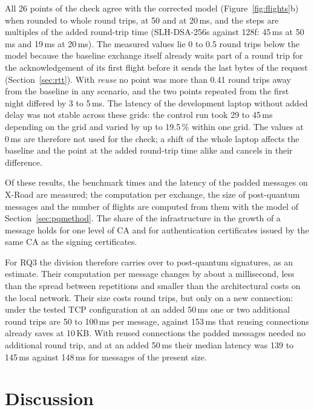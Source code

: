 \documentclass[conference,a4paper]{IEEEtran}
\newcommand{\newtext}[1]{{\color{blue}#1}}
\begin{document}
{\newtext{All} \newtext{26} \newtext{points} \newtext{of the check} \newtext{agree with the corrected model} \newtext{(Figure~\ref{fig:flights}\newtext{b})} when rounded
to whole round trips, at 50 and at 20\,ms, and the steps are multiples of the added round-trip time
(SLH-DSA-256s against 128f: 45\,ms at 50\,ms and 19\,ms at 20\,ms). The measured values lie 0 to 0.5
round trips below the model because the baseline exchange itself already waits part of a round trip
for the acknowledgement of its first flight before it sends the last bytes of the request
(Section~\ref{sec:rtt}). With \emph{reuse} \newtext{no point was more than 0.41 round trips away
from the baseline} in any scenario,
and the two points repeated from the first night differed by 3 to 5\,ms. \newtext{The latency of
the development laptop without added delay was not stable across these grids: the control run took
29 to 45\,ms depending on the grid and varied by up to 19.5\,\% within one grid. The values at 0\,ms
are therefore not used for the check; a shift of the whole laptop affects the baseline and the point
at the added round-trip time alike and cancels in their difference.}

\newtext{Of these results, the benchmark times and the latency of the padded messages on X-Road are
measured; the computation per exchange, the size of post-quantum messages and the number of flights
are computed from them with the model of Section~\ref{sec:pqmethod}. The share of the infrastructure
in the growth of a message holds for one level of CA and for authentication certificates issued by
the same CA as the signing certificates.}

For RQ3 the division therefore carries over to post-quantum signatures\newtext{, as an estimate}. Their computation per message
changes by about a millisecond, less than the spread between repetitions and smaller than the
architectural costs on the local network. Their size costs round trips, but only on a new
connection\newtext{: under the tested TCP configuration} at an added 50\,ms one or two additional
round trips are 50 to 100\,ms per message, against 153\,ms that reusing connections already saves at
10\,KB\newtext{. With reused connections the padded messages needed no additional round trip, and at an
added 50\,ms their median latency was 139 to 145\,ms against 148\,ms for messages of the present
size}.\par}

\section{Discussion}
\end{document}
